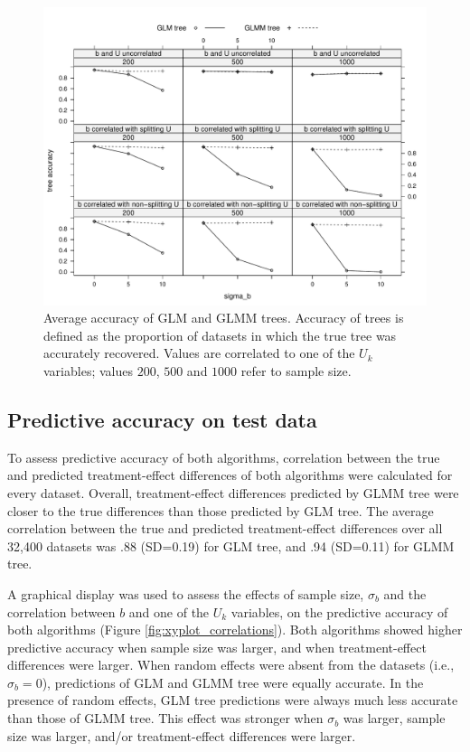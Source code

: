 \documentclass[nobf,doc]{apa}
\begin{document}
\begin{figure}[!htbp]
	\includegraphics[width=15cm]{xy_accuracy.pdf}
	\caption{Average accuracy of GLM and GLMM trees. Accuracy of trees is defined as the proportion of datasets in which the true tree was accurately recovered. Values are correlated to one of the $U_k$ variables; values $200$, $500$ and $1000$ refer to sample size.}
	\label{fig:xyplot_treeaccuracy}
\end{figure}





\subsection{Predictive accuracy on test data}

To assess predictive accuracy of both algorithms, correlation between the true and predicted treatment-effect differences of both algorithms were calculated for every dataset. Overall, treatment-effect differences predicted by GLMM tree were closer to the true differences than those predicted by GLM tree. The average correlation between the true and predicted treatment-effect differences over all 32,400 datasets was .88 (SD=0.19) for GLM tree, and .94 (SD=0.11) for GLMM tree.

A graphical display was used to assess the effects of sample size, $\sigma_b$ and the correlation between $b$ and one of the $U_k$ variables, on the predictive accuracy of both algorithms (Figure \ref{fig:xyplot_correlations}). Both algorithms showed higher predictive accuracy when sample size was larger, and when treatment-effect differences were larger. When random effects were absent from the datasets (i.e., $\sigma_b = 0$), predictions of GLM and GLMM tree were equally accurate. In the presence of random effects, GLM tree predictions were always much less accurate than those of GLMM tree. This effect was stronger when $\sigma_b$ was larger, sample size was larger, and/or treatment-effect differences were larger.
\end{document}
